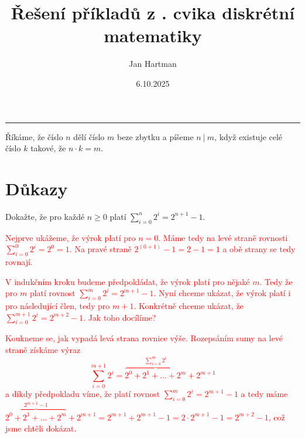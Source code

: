 \documentclass[10pt]{article}
\title{Řešení příkladů z \tutnum. cvika diskrétní matematiky}
\author{Jan Hartman}
\date{6.10.2025}
\newcommand{\titlerule}{%
    \vspace{5pt}
\noindent %
    \makebox[\textwidth]{\large \thetitle \hfill \thedate}
    \rule{\textwidth}{0.4pt}%
}
\begin{document}
\titlerule

\begin{defn}
    Říkáme, že číslo $n$ dělí číslo $m$ beze zbytku a píšeme $n \ | \ m$, když existuje celé číslo $k$ takové, že $n \cdot k = m$.
\end{defn}

\section{Důkazy}

\begin{problem}
Dokažte, že pro každé $n \geq 0$ platí $\sum_{i=0}^{n}2^i = 2^{n+1} - 1$.

\vspace{5pt}
\noindent
\textcolor{red}{Nejprve ukážeme, že výrok platí pro $n=0$. Máme tedy na levé straně rovnosti $\sum_{i=0}^{0}2^i=2^0=1$. Na pravé straně $2^{(0+1)}-1=2-1=1$ a obě strany se tedy rovnají.}

\vspace{5pt}
\noindent
\textcolor{red}{V indukčním kroku budeme předpokládat, že výrok platí pro nějaké $m$. Tedy že pro $m$ platí rovnost $\sum_{i=0}^{m}2^i = 2^{m+1} - 1$. Nyní chceme ukázat, že výrok platí i pro následující člen, tedy pro $m+1$. Konkrétně chceme ukázat, že $\sum_{i=0}^{m+1}2^i = 2^{m+2} - 1$. Jak toho docílíme?}

\vspace{5pt}
\noindent
\textcolor{red}{Koukneme se, jak vypadá levá strana rovnice výše. Rozepsáním sumy na levé straně získáme výraz $$\sum_{i=0}^{m+1}2^i = \overbrace{2^0 + 2^1 + \ldots + 2^m}^{\sum_{i=0}^{m}2^i} + 2^{m+1}$$ a díkdy předpokladu víme, že platí rovnost $\sum_{i=0}^{m}2^i = 2^{m+1} - 1$ a tedy máme $\overbrace{2^0 + 2^1 + \ldots + 2^m}^{2^{m+1}-1} + 2^{m+1} = 2^{m+1} + 2^{m+1} - 1 = 2 \cdot 2^{m+1} - 1 = 2^{m+2} -1$, což jsme chtěli dokázat.}
\end{problem}
\end{document}
